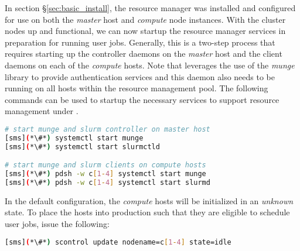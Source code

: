 In section \S\ref{sec:basic_install}, the \SLURM{} resource manager was installed
and configured for use on both the {\em master} host and {\em compute} node
instances. With the cluster nodes up and functional, we can now startup the
resource manager services in preparation for running user jobs. Generally, this
is a two-step process that requires starting up the controller daemons on the {\em
 master} host and the client daemons on each of the {\em compute} hosts.
Note that \SLURM{} leverages the use of the {\em munge} library to provide
authentication services and this daemon also needs to be running on all hosts
within the resource management pool. 
The following commands can be used to startup the necessary services to support
resource management under \SLURM{}.

\vspace*{0.3cm}

\begin{lstlisting}[language=bash]
# start munge and slurm controller on master host
[sms](*\#*) systemctl start munge
[sms](*\#*) systemctl start slurmctld

# start munge and slurm clients on compute hosts
[sms](*\#*) pdsh -w c[1-4] systemctl start munge
[sms](*\#*) pdsh -w c[1-4] systemctl start slurmd
\end{lstlisting}

In the default configuration, the {\em compute} hosts will be initialized in an
{\em unknown} state. To place the hosts into production such that they are
eligible to schedule user jobs, issue the following:

\begin{lstlisting}[language=bash]
[sms](*\#*) scontrol update nodename=c[1-4] state=idle
\end{lstlisting}



